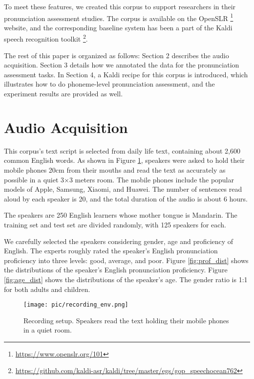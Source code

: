 \documentclass[a4paper]{article}
\begin{document}
To meet these features, we created this corpus to support researchers in their pronunciation assessment studies.
The corpus is available on the OpenSLR \footnote{\url{https://www.openslr.org/101}} website, and the corresponding baseline system has been a part of the Kaldi speech recognition toolkit \footnote{\url{https://github.com/kaldi-asr/kaldi/tree/master/egs/gop\_speechocean762}}.

The rest of this paper is organized as follows: Section 2 describes the audio acquisition. Section 3 details how we annotated the data for the pronunciation assessment tasks. In Section 4, a Kaldi recipe for this corpus is introduced, which illustrates how to do phoneme-level pronunciation assessment, and the experiment results are provided as well.

\section{Audio Acquisition}
\label{sec:audio}

This corpus's text script is selected from daily life text, containing about 2,600 common English words. As shown in Figure \ref{fig:recording}, speakers were asked to hold their mobile phones 20cm from their mouths and read the text as accurately as possible in a quiet 3$\times$3 meters room. The mobile phones include the popular models of Apple, Samsung, Xiaomi, and Huawei. The number of sentences read aloud by each speaker is 20, and the total duration of the audio is about 6 hours.

The speakers are 250 English learners whose mother tongue is Mandarin.
The training set and test set are divided randomly, with 125 speakers for each.

We carefully selected the speakers considering gender, age and proficiency of English.
The experts roughly rated the speaker's English pronunciation proficiency into three levels: good, average, and poor.
Figure \ref{fig:prof_dist} shows the distributions of the speaker's English pronunciation proficiency. 
Figure \ref{fig:age_dist} shows the distributions of the speaker's age. 
The gender ratio is 1:1 for both adults and children.

\begin{figure}[t]
  \centering
  \texttt{[image: pic/recording\_env.png]}
  \caption{Recording setup. Speakers read the text holding their mobile phones in a quiet room.}
  \label{fig:recording}
\end{figure}
\end{document}
